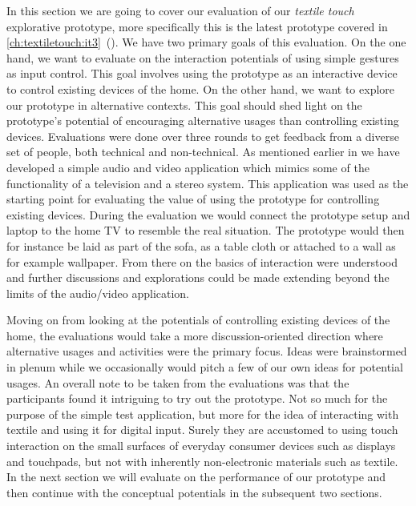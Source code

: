 In this section we are going to cover our evaluation of our \emph{textile touch} explorative prototype, more specifically this is the latest prototype covered in \ref{ch:textiletouch:it3}~().
We have two primary goals of this evaluation.
On the one hand, we want to evaluate on the interaction potentials of using simple gestures as input control.
This goal involves using the prototype as an interactive device to control existing devices of the home.
On the other hand, we want to explore our prototype in alternative contexts.
This goal should shed light on the prototype's potential of encouraging alternative usages than controlling existing devices.
Evaluations were done over three rounds to get feedback from a diverse set of people, both technical and non-technical.
\blank
As mentioned earlier in \emph{  } we have developed a simple audio and video application which mimics some of the functionality of a television and a stereo system.
This application was used as the starting point for evaluating the value of using the prototype for controlling existing devices.
During the evaluation we would connect the prototype setup and laptop to the home TV to resemble the real situation.
The prototype would then for instance be laid as part of the sofa, as a table cloth or attached to a wall as for example wallpaper.
From there on the basics of interaction were understood and further discussions and explorations could be made extending beyond the limits of the audio/video application.

Moving on from looking at the potentials of controlling existing devices of the home, the evaluations would take a more discussion-oriented direction where alternative usages and activities were the primary focus.
Ideas were brainstormed in plenum while we occasionally would pitch a few of our own ideas for potential usages.
\blank
An overall note to be taken from the evaluations was that the participants found it intriguing to try out the prototype.
Not so much for the purpose of the simple test application, but more for the idea of interacting with textile and using it for digital input.
Surely they are accustomed to using touch interaction on the small surfaces of everyday consumer devices such as displays and touchpads, but not with inherently non-electronic materials such as textile.
\blank
In the next section we will evaluate on the performance of our prototype and then continue with the conceptual potentials in the subsequent two sections.

